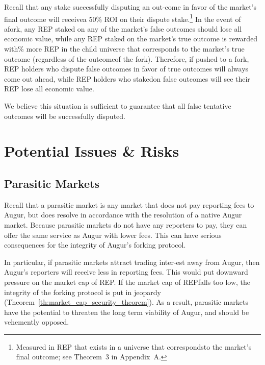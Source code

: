\documentclass[12pt,floatfix,reprint,nofootinbib,amsmath,amssymb,epsfig,pre,floats,letterpaper,groupedaffiliation]{revtex4-1}
\theoremstyle{definition}
\theoremstyle{definition}
\begin{document}
Recall that any stake successfully disputing an out-\linebreak come in favor of the market's final outcome will receive\linebreak a 50\% ROI on their dispute stake.\footnote{Measured in REP that exists in a universe that corresponds\linebreak to the market's final outcome; see Theorem~3 in Appendix~A.} In the event of a\linebreak fork, any REP staked on any of the market's false outcomes should lose all economic value, while any REP staked on the market's true outcome is rewarded with\% more REP in the child universe that corresponds to the market's true outcome (regardless of the outcome\linebreak of the fork). Therefore, if pushed to a fork, REP holders who dispute false outcomes in favor of true outcomes will always come out ahead, while REP holders who staked\linebreak on false outcomes will see their REP lose all economic value.

We believe this situation is sufficient to guarantee that all false tentative outcomes will be successfully disputed.

\section{Potential Issues \& Risks}

\subsection{Parasitic Markets}

Recall that a parasitic market is any market that does not pay reporting fees to Augur, but does resolve in accordance with the resolution of a native Augur market. Because parasitic markets do not have any reporters to pay, they can offer the same service as Augur with lower fees. This can have serious consequences for the integrity of Augur's forking protocol.

In particular, if parasitic markets attract trading inter-\linebreak est away from Augur, then Augur's reporters will receive less in reporting fees. This would put downward pressure on the market cap of REP. If the market cap of REP\linebreak falls too low, the integrity of the forking protocol is put in jeopardy (Theorem~\ref{th:market_cap_security_theorem}). As a result, parasitic markets have the potential to threaten the long term viability of Augur, and should be vehemently opposed.
\end{document}
